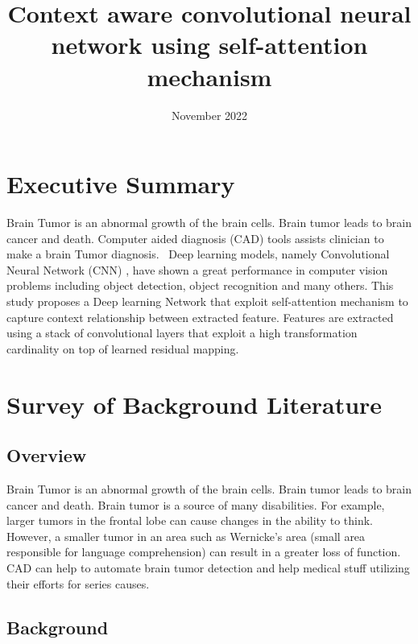 \documentclass{article}
\title{Context aware convolutional neural network using self-attention mechanism }
\date{November 2022}
\begin{document}
\maketitle


\section{Executive Summary}

Brain Tumor is an abnormal growth of the brain cells\cite{deangelis2001brain}. Brain tumor leads to brain cancer and death\cite{deangelis2001brain}. Computer aided diagnosis (CAD) tools assists clinician to make a brain Tumor diagnosis.
~Deep learning \cite{lecun2015deep} models, namely Convolutional Neural Network (CNN) \cite{lecun1989handwritten}, have shown a great performance in computer vision problems including object detection\cite{erhan2014scalable}\cite{girshick2014rich}\cite{sermanet2013overfeat}\cite{redmon2016you}, object recognition\cite{simonyan2014very}\cite{he2016deep} and many others.
This study proposes a Deep learning Network that exploit self-attention mechanism \cite{vaswani2017attention} to capture context relationship between extracted feature. Features are extracted using a stack of convolutional layers that exploit a high transformation cardinality\cite{xie2017aggregated} on top of learned residual mapping\cite{he2016deep}.


\section{Survey of Background Literature}

\subsection{Overview}
Brain Tumor is an abnormal growth of the brain cells\cite{deangelis2001brain}. Brain tumor leads to brain cancer and death\cite{deangelis2001brain}. Brain tumor is a source of many disabilities. For example, larger tumors in the frontal lobe can cause changes in the ability to think. However, a smaller tumor in an area such as Wernicke's area (small area responsible for language comprehension) can result in a greater loss of function. CAD can help to automate brain tumor detection and help medical stuff utilizing their efforts for series causes.

\subsection{Background}
\end{document}
